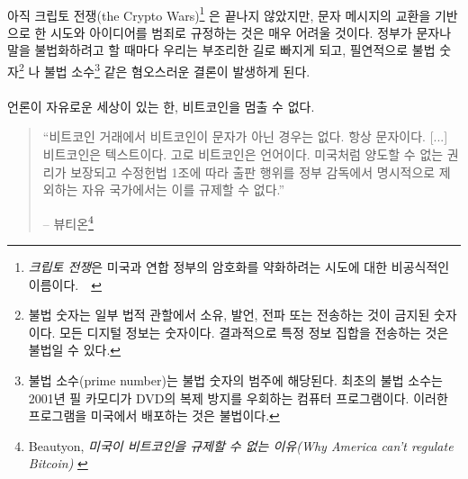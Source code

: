 \paragraph{}
아직 크립토 전쟁(the Crypto Wars)\footnote{\textit{크립토 전쟁}은 미국과 연합 정부의 암호화를 약화하려는 시도에 대한 비공식적인 이름이다.~\cite{eff-cryptowars}~\cite{wiki:cryptowars}} 
은 끝나지 않았지만, 문자 메시지의 교환을 기반으로 한 시도와 아이디어를 범죄로 규정하는 것은 매우 어려울 것이다.
정부가 문자나 말을 불법화하려고 할 때마다 우리는 부조리한 길로 빠지게 되고, 필연적으로 
불법 숫자\footnote{불법 숫자는 일부 법적 관할에서 소유, 발언, 전파 또는 전송하는 것이 금지된 숫자이다. 모든 디지털 정보는 숫자이다.	결과적으로 특정 정보 집합을 전송하는 것은 불법일 수 있다.\cite{wiki:illegal-number}}
나 불법 소수\footnote{불법 소수(prime number)는 불법 숫자의 범주에 해당된다. 최초의 불법 소수는 2001년 필 카모디가 DVD의 복제 방지를 우회하는 컴퓨터 프로그램이다. 이러한 프로그램을 미국에서 배포하는 것은 불법이다.\cite{wiki:illegal-prime}}
 같은 혐오스러운 결론이 발생하게 된다.

\paragraph{}
언론이 자유로운 세상이 있는 한, 비트코인을 멈출 수 없다.

\begin{quotation}\begin{samepage}
		\enquote{비트코인 거래에서 비트코인이 문자가 아닌 경우는 없다. 항상 문자이다. [...]
			비트코인은 텍스트이다. 고로 비트코인은 언어이다.
			미국처럼 양도할 수 없는 권리가 보장되고 수정헌법 1조에 따라 
			출판 행위를 정부 감독에서 명시적으로 제외하는 자유 국가에서는 이를 규제할 수 없다.}
		\begin{flushright} -- 뷰티온\footnote{Beautyon, \textit{미국이 비트코인을 규제할 수 없는 이유(Why America can't regulate Bitcoin)} \cite{america-regulate-bitcoin}}
\end{flushright}\end{samepage}\end{quotation}

